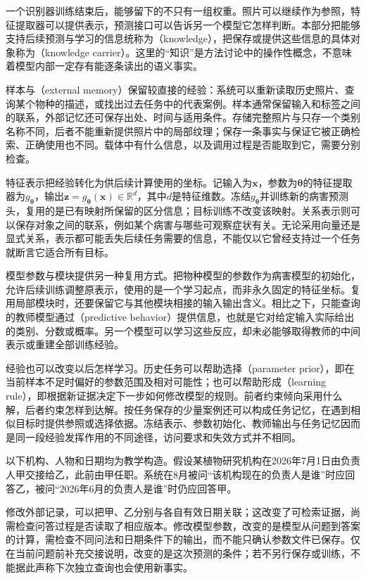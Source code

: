 一个识别器训练结束后，能够留下的不只有一组权重。照片可以继续作为参照，特征提取器可以提供表示，预测接口可以告诉另一个模型它怎样判断。本部分把能够支持后续预测与学习的信息统称为（knowledge），把保存或提供这些信息的具体对象称为（knowledge carrier）。这里的“知识”是方法讨论中的操作性概念，不意味着模型内部一定存有能逐条读出的语义事实。

样本与（external memory）保留较直接的经验：系统可以重新读取历史照片、查询某个物种的描述，或找出过去任务中的代表案例。样本通常保留输入和标签之间的联系，外部记忆还可保存出处、时间与适用条件。存储完整照片与只存一个类别名称不同，后者不能重新提供照片中的局部纹理；保存一条事实与保证它被正确检索、正确使用也不同。载体中有什么信息，以及调用过程是否能取到它，需要分别检查。

特征表示把经验转化为供后续计算使用的坐标。记输入为$\bm{x}$，参数为$\bm{\theta}$的特征提取器为$g_{\bm{\theta}}$，输出$\bm{z}=g_{\bm{\theta}}(\bm{x})\in\mathbb R^d$，其中$d$是特征维数。冻结$g_{\bm{\theta}}$并训练新的病害预测头，复用的是已有映射所保留的区分信息；目标训练不改变该映射。关系表示则可以保存对象之间的联系，例如某个病害与哪些可观察症状有关。无论采用向量还是显式关系，表示都可能丢失后续任务需要的信息，不能仅以它曾经支持过一个任务就断言它适合所有目标。

模型参数与模块提供另一种复用方式。把物种模型的参数作为病害模型的初始化，允许后续训练调整原表示，使用的是一个学习起点，而非永久固定的特征坐标。复用局部模块时，还要保留它与其他模块相接的输入输出含义。相比之下，只能查询的教师模型通过（predictive behavior）提供信息，也就是它对给定输入实际给出的类别、分数或概率。另一个模型可以学习这些反应，却未必能够取得教师的中间表示或重建全部训练经验。

经验也可以改变以后怎样学习。历史任务可以帮助选择（parameter prior），即在当前样本不足时偏好的参数范围及相对可能性；也可以帮助形成（learning rule），即根据新证据决定下一步如何修改模型的规则。前者约束倾向采用什么解，后者约束怎样到达解。按任务保存的少量案例还可以构成任务记忆，在遇到相似目标时提供参照或选择依据。冻结表示、参数初始化、教师输出与任务记忆因而是同一段经验发挥作用的不同途径，访问要求和失效方式并不相同。

\begin{example}[带生效日期的事实修正]
\label{ex:ket-overview-dated-fact}
以下机构、人物和日期均为教学构造。假设某植物研究机构在2026年7月1日由负责人甲交接给乙，此前由甲任职。系统在8月被问“该机构现在的负责人是谁”时应回答乙，被问“2026年6月的负责人是谁”时仍应回答甲。

修改外部记录，可以把甲、乙分别与各自有效日期关联；这改变了可检索证据，尚需检查问答过程是否读取了相应版本。修改模型参数，改变的是模型从问题到答案的计算，需检查不同问法和日期条件下的输出，而不能只确认参数文件已保存。仅在当前问题前补充交接说明，改变的是这次预测的条件；若不另行保存或训练，不能据此声称下次独立查询也会使用新事实。
\end{example}

